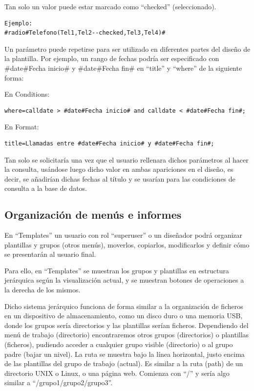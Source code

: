 \documentclass[spanish,12pt]{book}
\begin{document}
\begin{itemize}
	Tan solo un valor puede estar marcado como ``checked'' (seleccionado).\\
	
\begin{lstlisting}
Ejemplo:
#radio#Telefono(Tel1,Tel2--checked,Tel3,Tel4)#
\end{lstlisting}
\end{itemize}

Un parámetro puede repetirse para ser utilizado en diferentes partes del diseño de la plantilla. Por ejemplo, un rango de fechas podría ser especificado con \#date\#Fecha inicio\# y \#date\#Fecha fin\# en ``title'' y ``where'' de la siguiente forma:

En Conditions:
\begin{lstlisting}
where=calldate > #date#Fecha inicio# and calldate < #date#Fecha fin#;
\end{lstlisting}
En Format:
\begin{lstlisting}
title=Llamadas entre #date#Fecha inicio# y #date#Fecha fin#;
\end{lstlisting}

Tan solo se solicitaría una vez que el usuario rellenara dichos parámetros al hacer la consulta, usándose luego dicho valor en ambas apariciones en el diseño, es decir, se añadirían dichas fechas al título y se usarían para las condiciones de consulta a la base de datos.

\subsection{Organización de menús e informes}
En ``Templates'' un usuario con rol ``superuser'' o un diseñador podrá organizar plantillas y grupos (otros menús), moverlos, copiarlos, modificarlos y definir cómo se presentarán al usuario final.

Para ello, en ``Templates'' se muestran los grupos y plantillas en estructura jerárquica según la visualización actual, y se muestran botones de operaciones a la derecha de los mismos.

Dicho sistema jerárquico funciona de forma similar a la organización de ficheros en un dispositivo de almacenamiento, como un disco duro o una memoria USB, donde los grupos sería directorios y las plantillas serían ficheros. Dependiendo del menú de trabajo (directorio) encontraremos otros grupos (directorios) o plantillas (ficheros), pudiendo acceder a cualquier grupo visible (directorio) o al grupo padre (bajar un nivel). La ruta se muestra bajo la línea horizontal, justo encima de las plantillas del grupo de trabajo (actual). Es similar a la ruta (path) de un directorio UNIX o Linux, o una página web. Comienza con ``/'' y sería algo similar a ``/grupo1/grupo2/grupo3''.
\end{document}
